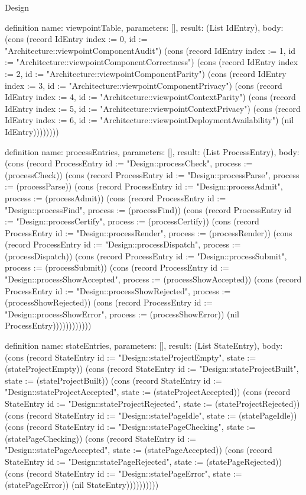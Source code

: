 \begin{lexlean}{Design}
\begin{semanticmodule}
definition{
  name: viewpointTable,
  parameters: [],
  result: (List IdEntry),
  body: (cons (record IdEntry {index := 0, id := "Architecture::viewpointComponentAudit"}) (cons (record IdEntry {index := 1, id := "Architecture::viewpointComponentCorrectness"}) (cons (record IdEntry {index := 2, id := "Architecture::viewpointComponentParity"}) (cons (record IdEntry {index := 3, id := "Architecture::viewpointComponentPrivacy"}) (cons (record IdEntry {index := 4, id := "Architecture::viewpointContextParity"}) (cons (record IdEntry {index := 5, id := "Architecture::viewpointContextPrivacy"}) (cons (record IdEntry {index := 6, id := "Architecture::viewpointDeploymentAvailability"}) (nil IdEntry))))))))
}

definition{
  name: processEntries,
  parameters: [],
  result: (List ProcessEntry),
  body: (cons (record ProcessEntry {id := "Design::processCheck", process := (processCheck)}) (cons (record ProcessEntry {id := "Design::processParse", process := (processParse)}) (cons (record ProcessEntry {id := "Design::processAdmit", process := (processAdmit)}) (cons (record ProcessEntry {id := "Design::processFind", process := (processFind)}) (cons (record ProcessEntry {id := "Design::processCertify", process := (processCertify)}) (cons (record ProcessEntry {id := "Design::processRender", process := (processRender)}) (cons (record ProcessEntry {id := "Design::processDispatch", process := (processDispatch)}) (cons (record ProcessEntry {id := "Design::processSubmit", process := (processSubmit)}) (cons (record ProcessEntry {id := "Design::processShowAccepted", process := (processShowAccepted)}) (cons (record ProcessEntry {id := "Design::processShowRejected", process := (processShowRejected)}) (cons (record ProcessEntry {id := "Design::processShowError", process := (processShowError)}) (nil ProcessEntry))))))))))))
}

definition{
  name: stateEntries,
  parameters: [],
  result: (List StateEntry),
  body: (cons (record StateEntry {id := "Design::stateProjectEmpty", state := (stateProjectEmpty)}) (cons (record StateEntry {id := "Design::stateProjectBuilt", state := (stateProjectBuilt)}) (cons (record StateEntry {id := "Design::stateProjectAccepted", state := (stateProjectAccepted)}) (cons (record StateEntry {id := "Design::stateProjectRejected", state := (stateProjectRejected)}) (cons (record StateEntry {id := "Design::statePageIdle", state := (statePageIdle)}) (cons (record StateEntry {id := "Design::statePageChecking", state := (statePageChecking)}) (cons (record StateEntry {id := "Design::statePageAccepted", state := (statePageAccepted)}) (cons (record StateEntry {id := "Design::statePageRejected", state := (statePageRejected)}) (cons (record StateEntry {id := "Design::statePageError", state := (statePageError)}) (nil StateEntry))))))))))
}


\end{semanticmodule}
\end{lexlean}
